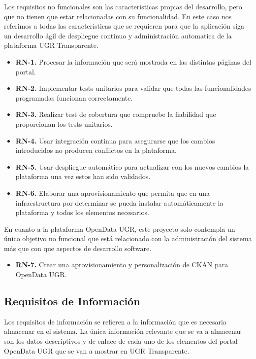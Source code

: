 Los requisitos no funcionales son las características propias del desarrollo, pero que no tienen que estar relacionadas con su 
funcionalidad. En este caso nos referimos a todas las características que se requieren para que la aplicación siga un 
desarrollo ágil de despliegue continuo y administración automatica de la plataforma UGR Transparente.

\begin{itemize}
  \item \textbf{RN-1.} Procesar la información que será mostrada en las distintas páginas del portal.
  \item \textbf{RN-2.} Implementar tests unitarios para validar que todas las funcionalidades programadas funcionan 
  correctamente.
  \item \textbf{RN-3.} Realizar test de cobertura que compruebe la fiabilidad que proporcionan los tests unitarios.
  \item \textbf{RN-4.} Usar integración continua para asegurarse que los cambios introducidos no producen conflictos en la 
  plataforma.
  \item \textbf{RN-5.} Usar despliegue automático para actualizar con los nuevos cambios la plataforma una vez estos han sido 
  validados.
  \item \textbf{RN-6.} Elaborar una aprovisionamiento que permita que en una infraestructura por determinar se pueda instalar 
  automáticamente la plataforma y todos los elementos necesarios.
\end{itemize}

En cuanto a la plataforma OpenData UGR, este proyecto solo contempla un único objetivo no funcional que está relacionado con
la administración del sistema más que con que aspectos de desarrollo software.

\begin{itemize}
  \item \textbf{RN-7.} Crear una aprovisionamiento y personalización de CKAN para OpenData UGR.
\end{itemize}

\subsection{Requisitos de Información}

Los requisitos de información se refieren a la información que es necesaria almacenar en el sistema. La única información 
relevante que se va a almacenar son los datos descriptivos y de enlace de cada uno de los elementos del portal OpenData UGR 
que se van a mostrar en UGR Transparente.

